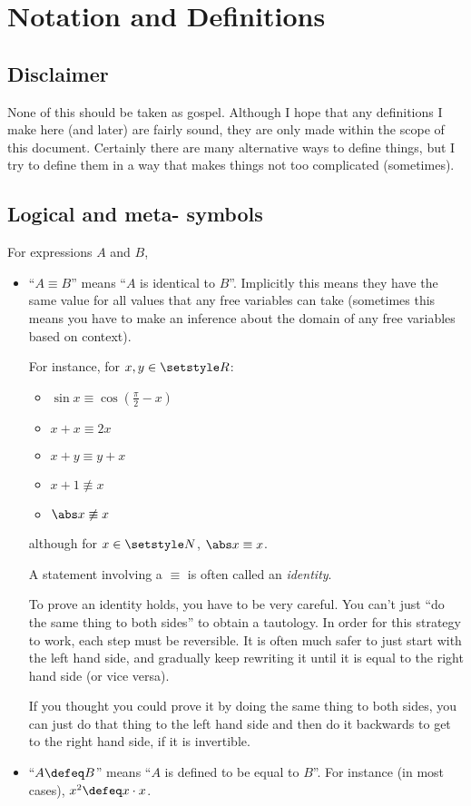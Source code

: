 \section*{Notation and Definitions}

\subsection*{Disclaimer}

None of this should be taken as gospel. Although I hope that any definitions I
make here (and later) are fairly sound, they are only made within the scope of
this document. Certainly there are many alternative ways to define things, but I
try to define them in a way that makes things not too complicated (sometimes).

\subsection*{Logical and meta- symbols}
For expressions \(A\) and \(B\),
\begin{itemize}
 \item
  ``\(A \equiv B\)'' means ``\(A\) is identical to \(B\)''. Implicitly this
  means they have the same value for all values that any free variables can take
  (sometimes this means you have to make an inference about the domain of any
  free variables based on context).

  For instance, for \(x, y \in \Reals\):
  \begin{itemize}[label=\raisebox{0.2ex}{\tiny\textbullet}]
   \item \(\sin x \equiv \cos(\frac \pi 2 - x)\)
   \item \(x + x \equiv 2x\)
   \item \(x + y \equiv y + x\)
   \item \(x + 1 \nequiv x\)
   \item \(\abs x \nequiv x\)
  \end{itemize}
  although for \(x \in \Naturals\), \(\abs x \equiv x\).

  A statement involving a \(\equiv\) is often called an \emph{identity}.

  To prove an identity holds, you have to be very careful. You can't just ``do
  the same thing to both sides'' to obtain a tautology. In order for this
  strategy to work, each step must be reversible. It is often much safer to just
  start with the left hand side, and gradually keep rewriting it until it is
  equal to the right hand side (or vice versa).

  If you thought you could prove it by doing the same thing to both sides, you
  can just do that thing to the left hand side and then do it backwards to get
  to the right hand side, if it is invertible.
 \item
  ``\(A \defeq B\)'' means ``\(A\) is defined to be equal to \(B\)''. For
  instance (in most cases), \(x^2 \defeq x \cdot x\).
\end{itemize}

